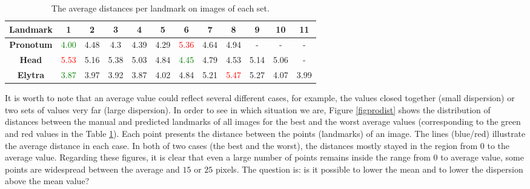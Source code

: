 \documentclass[review]{elsarticle}
\begin{document}
\begin{table}[h!]
	\centering	
	\begin{tabular}{|c|c|c|c|c|c|c|c|c|c|c|c|}
		\hline
		\textbf{Landmark} & 1 & 2 & 3 & 4 & 5 & 6 & 7 & 8 & 9 & 10 & 11 \\ \hline
		\textbf{Pronotum} & \textcolor{green}{4.00} & 4.48 & 4.3 & 4.39 & 4.29 & \textcolor{red}{5.36} & 4.64 & 4.94 & - & - & - \\ \hline
		\textbf{Head} & \textcolor{red}{5.53} & 5.16 & 5.38 & 5.03 & 4.84 & \textcolor{green}{4.45} & 4.79 & 4.53 & 5.14 & 5.06 & - \\ \hline
		\textbf{Elytra} & \textcolor{green}{3.87} & 3.97 & 3.92 & 3.87 & 4.02 & 4.84 & 5.21 & \textcolor{red}{5.47} & 5.27 & 4.07 & 3.99 \\ \hline
	\end{tabular}
	\caption{The average distances per landmark on images of each set.}
	\label{tblavgpronotum}
\end{table}

It is worth to note that an average value could reflect several different cases, for example, the values closed together (small dispersion) or two sets of values very far (large dispersion). In order to see in which situation we are, Figure \ref{figprodist} shows the distribution of distances between the manual and predicted landmarks of all images for the best and the worst average values (corresponding to the green and red values in the Table \ref{tblavgpronotum}). Each point presents the distance between the points (landmarks) of an image. The lines (blue/red) illustrate the average distance in each case. In both of two cases (the best and the worst), the distances mostly stayed in the region from $0$ to the average value. Regarding these figures, it is clear that even a large number of points remains inside the range from $0$ to average value, some points are widespread between the average and $15$ or $25$ pixels. The question is: is it possible to lower the mean and to lower the dispersion above the mean value?
\end{document}
